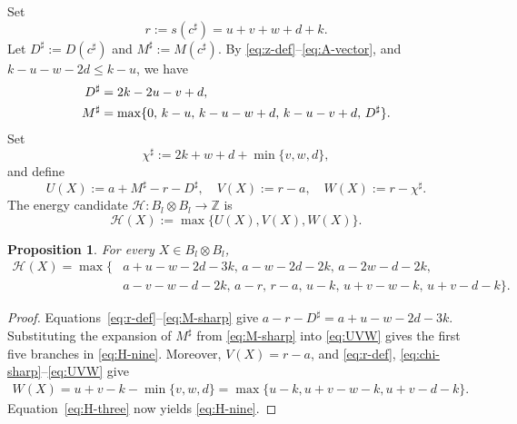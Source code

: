 \documentclass[11pt,reqno]{amsart}
\newcommand{\HH}{\mathcal H}
\numberwithin{table}{section}
\numberwithin{equation}{section}
\theoremstyle{plain}
\newtheorem{proposition}[theorem]{Proposition}
\theoremstyle{definition}
\begin{document}
Set
\begin{equation}\label{eq:r-def}
	r:=s(c^\sharp)=u+v+w+d+k.
\end{equation}
Let \(D^\sharp:=D(c^\sharp)\) and \(M^\sharp:=M(c^\sharp)\).
By \eqref{eq:z-def}--\eqref{eq:A-vector}, and
\(k-u-w-2d\le k-u\), we have
\begin{align}
	D^\sharp
	&=2k-2u-v+d,
	\notag\\
	M^\sharp
	&=
	\max\{
	0,\,
	k-u,\,
	k-u-w+d,\,
	k-u-v+d,\,
	D^\sharp
	\}.
	\label{eq:M-sharp}
\end{align}
Set
\begin{equation}\label{eq:chi-sharp}
	\chi^\sharp
	:=
	2k+w+d+\min\{v,w,d\},
\end{equation}
and define
\begin{equation}\label{eq:UVW}
	U(X):=a+M^\sharp-r-D^\sharp,
	\quad
	V(X):=r-a,
	\quad
	W(X):=r-\chi^\sharp.
\end{equation}
The energy candidate
\(\HH:B_l\otimes B_l\longrightarrow\mathbb Z\) is
\begin{equation}\label{eq:H-three}
	\HH(X):=\max\{U(X),V(X),W(X)\}.
\end{equation}

\begin{proposition}
	\label{prop:nine-branch}
	For every \(X\in B_l\otimes B_l\),
	\begin{equation}\label{eq:H-nine}
		\begin{aligned}
			\HH(X)=\max\bigl\{&
			a+u-w-2d-3k,\,
			a-w-2d-2k,\,
			a-2w-d-2k,\\
			&
			a-v-w-d-2k,\,
			a-r,\,
			r-a,\,
			u-k,\,
			u+v-w-k,\,
			u+v-d-k
			\bigr\}.
		\end{aligned}
	\end{equation}
\end{proposition}

\begin{proof}
	Equations~\eqref{eq:r-def}--\eqref{eq:M-sharp} give $a-r-D^\sharp=a+u-w-2d-3k$.
	Substituting the expansion of \(M^\sharp\) from
	\eqref{eq:M-sharp} into \eqref{eq:UVW} gives the first five
	branches in \eqref{eq:H-nine}.
	Moreover, \(V(X)=r-a\), and
	\eqref{eq:r-def}, \eqref{eq:chi-sharp}--\eqref{eq:UVW} give
	\[
	\begin{aligned}
		W(X)
		=u+v-k-\min\{v,w,d\}
		=\max\{u-k,u+v-w-k,u+v-d-k\}.
	\end{aligned}
	\]
	Equation~\eqref{eq:H-three} now yields \eqref{eq:H-nine}.
\end{proof}
\end{document}
